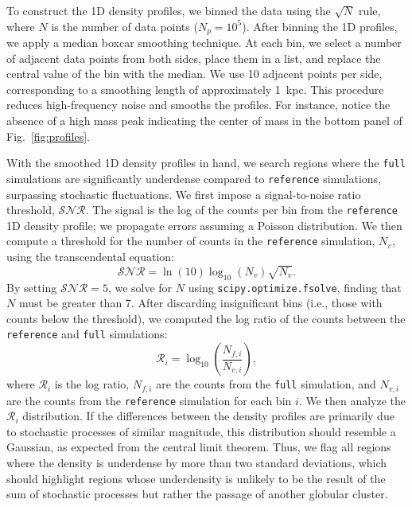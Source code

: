 \documentclass{aa}
\begin{document}
\begin{appendix}
    To construct the 1D density profiles, we binned the data using the $\sqrt{N}$ rule, where $N$ is the number of data points ($N_p = 10^5$). After binning the 1D profiles, we apply a median boxcar smoothing technique. At each bin, we select a number of adjacent data points from both sides, place them in a list, and replace the central value of the bin with the median. We use 10 adjacent points per side, corresponding to a smoothing length of approximately 1~kpc. This procedure reduces high-frequency noise and smooths the profiles. For instance, notice the absence of a high mass peak indicating the center of mass in the bottom panel of Fig.~\ref{fig:profiles}.

    With the smoothed 1D density profiles in hand, we search regions where the \texttt{full} simulations are significantly underdense compared to \texttt{reference} simulations, surpassing stochastic fluctuations. We first impose a signal-to-noise ratio threshold, $\mathcal{SNR}$. The signal is the log of the counts per bin from the \texttt{reference} 1D density profile; we propagate errors assuming a Poisson distribution. We then compute a threshold for the number of counts in the \texttt{reference} simulation, $N_v$, using the transcendental equation:
    \begin{equation}
        \mathcal{SNR} = \ln(10) \log_{10}\left(N_v\right) \sqrt{N_v}.
      \end{equation} \label{eq:density_threshold}
    By setting $\mathcal{SNR} = 5$, we solve for $N$ using \texttt{scipy.optimize.fsolve}, finding that $N$ must be greater than 7. After discarding insignificant bins (i.e., those with counts below the threshold), we computed the log ratio of the counts between the \texttt{reference} and \texttt{full} simulations:
    \begin{equation}
        \mathcal{R}_i = \log_{10}\left(\frac{N_{f,i}}{N_{v,i}}\right),
      \end{equation}
    where $\mathcal{R}_i$ is the log ratio, $N_{f,i}$ are the counts from the \texttt{full} simulation, and $N_{v,i}$ are the counts from the \texttt{reference} simulation for each bin $i$. We then analyze the $\mathcal{R}_i$ distribution. If the differences between the density profiles are primarily due to stochastic processes of similar magnitude, this distribution should resemble a Gaussian, as expected from the central limit theorem. Thus, we flag all regions where the density is underdense by more than two standard deviations, which should highlight regions whose underdensity is unlikely to be the result of the sum of stochastic processes but rather the passage of another globular cluster. 


\end{appendix}
\end{document}
